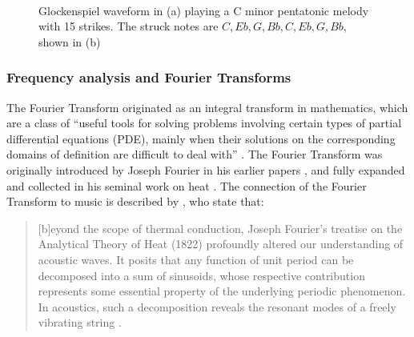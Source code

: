 \documentclass[report.tex]{subfiles}
\begin{document}
\begin{figure}[ht]
	\centering
	\\
	\caption{Glockenspiel waveform in (a) playing a C minor pentatonic melody with 15 strikes. The struck notes are $C, Eb, G, Bb, C, Eb, G, Bb$, shown in (b)}
	\label{fig:glockwaveform}
\end{figure}

\subsubsection{Frequency analysis and Fourier Transforms}
\label{sec:freqanal}

The Fourier Transform originated as an integral transform in mathematics, which are a class of ``useful tools for solving problems involving certain types of partial differential equations (PDE), mainly when their solutions on the corresponding domains of definition are difficult to deal with'' \parencite[54]{fourierhistory}. The Fourier Transform was originally introduced by Joseph Fourier in his earlier papers \parencite{fourierhist1, fourierhist2}, and fully expanded and collected in his seminal work on heat \parencite{fourierheat}. The connection of the Fourier Transform to music is described by \citeauthor{fouriermusic}, who state that:

\begin{quote}
	[b]eyond the scope of thermal conduction, Joseph Fourier's treatise on the Analytical Theory of Heat (1822) profoundly altered our understanding of acoustic waves. It posits that any function of unit period can be decomposed into a sum of sinusoids, whose respective contribution represents some essential property of the underlying periodic phenomenon. In acoustics, such a decomposition reveals the resonant modes of a freely vibrating string \parencite[461]{fouriermusic}.
\end{quote}
\end{document}
